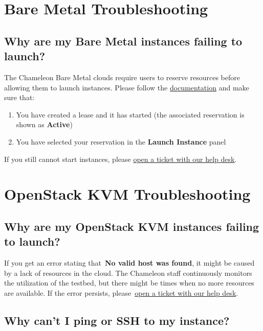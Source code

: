 \section{Bare Metal
Troubleshooting}\label{bare-metal-troubleshooting}

\subsection{Why are my Bare Metal instances failing to
launch?}\label{why-are-my-bare-metal-instances-failing-to-launch}

The Chameleon Bare Metal clouds require users to reserve resources
before allowing them to launch instances. Please follow the
\href{https://www.chameleoncloud.org/docs/bare-metal/}{documentation}
and make sure that:

\begin{enumerate}
\tightlist
\item
  You have created a lease and it has started (the associated
  reservation is shown as \textbf{Active})
\item
  You have selected your reservation in the \textbf{Launch Instance}
  panel
\end{enumerate}

If you still cannot start instances, please
\href{https://www.chameleoncloud.org/user/help/}{open a ticket with our
help desk}.

\section{OpenStack KVM
Troubleshooting}\label{openstack-kvm-troubleshooting}

\subsection{Why are my OpenStack KVM instances failing to
launch?}\label{why-are-my-openstack-kvm-instances-failing-to-launch}

If you get an error stating that~\textbf{No valid host was found}, it
might be caused by a lack of resources in the cloud. The Chameleon staff
continuously monitors the utilization of the testbed, but there might be
times when no more resources are available. If the error persists,
please~\href{https://www.chameleoncloud.org/user/help/}{open a ticket
with our help desk}.

\subsection{Why can't I ping or SSH to my
instance?}\label{why-cant-i-ping-or-ssh-to-my-instance}


